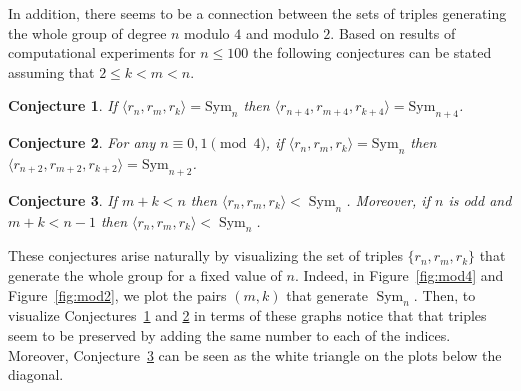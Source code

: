 \documentclass[
final
]{dmtcs-episciences}
\newtheorem{conjecture}{Conjecture}
\DeclareMathOperator{\Sym}{\mathrm{Sym}}
\begin{document}
In addition, there seems to be a connection between the sets of triples generating the whole group of degree $n$ modulo $4$ and modulo $2$. Based on results of computational experiments for $n \leqslant 100$ the following conjectures can be stated assuming that  $2\leqslant k < m < n$.

\begin{conjecture}
\label{conj:mod4}
If $\langle r_n, r_m,r_k\rangle=\mathrm{Sym}_{n}$ then $\langle r_{n+4},r_{m+4},r_{k+4}\rangle=\mathrm{Sym}_{n+4}$.
\end{conjecture}

\begin{conjecture}
\label{conj:mod2}
For any $n \equiv 0, 1 \pmod{4}$, if $\langle r_n,r_m,r_k\rangle=\mathrm{Sym}_{n}$ then $\langle r_{n+2},r_{m+2},r_{k+2}\rangle=\mathrm{Sym}_{n+2}$. 
\end{conjecture}

\begin{conjecture}
\label{conj:km_sum} If $m+k<n$ then $\langle r_n,r_m,r_k\rangle < \Sym_n$. Moreover, if $n$ is odd and $m+k<n-1$ then $\langle r_n,r_m,r_k\rangle < \Sym_n$.
\end{conjecture}

These conjectures arise naturally by visualizing the set of triples $\{r_n, r_m, r_k\}$ that generate the whole group for a fixed value of $n$. Indeed, in Figure~\ref{fig:mod4} and Figure~\ref{fig:mod2}, we plot the pairs $(m,k)$ that generate $\Sym_n$. Then, to visualize Conjectures~\ref{conj:mod4} and \ref{conj:mod2} in terms of these graphs notice that that triples seem to be preserved by adding the same number to each of the indices. Moreover, Conjecture~\ref{conj:km_sum} can be seen as the white triangle on the plots below the diagonal. 
\end{document}
